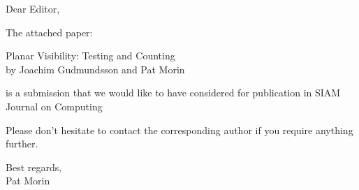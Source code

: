 \documentclass{article}
\begin{document}
Dear Editor,

The attached paper:

Planar Visibility: Testing and Counting \\
by Joachim Gudmundsson and Pat Morin

is a submission that we would like to have considered for publication
in SIAM Journal on Computing

Please don't hesitate to contact the corresponding author if you
require anything further.

\noindent
Best regards, \\
Pat Morin
\end{document}
